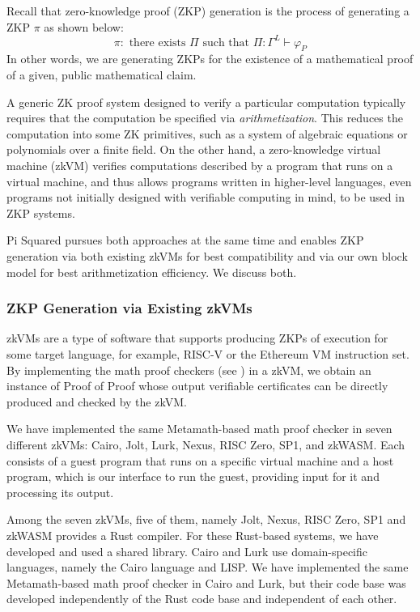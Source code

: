 \documentclass{article}
\begin{document}
Recall that zero-knowledge proof (ZKP) generation is the process of generating
a ZKP $\pi$ as shown below:
\begin{equation*}
\pi \colon \text{ there exists $\Pi$ such that } \Pi \colon \Gamma^L \vdash \varphi_P
\end{equation*}
In other words, we are generating ZKPs for the existence of a mathematical proof of a given, public
mathematical claim.

A generic ZK proof system designed to verify a particular computation
typically requires that the computation be specified via \textit{arithmetization}.
This reduces the computation into some ZK primitives, such as a system of algebraic equations or polynomials
over a finite field.
On the other hand, a zero-knowledge virtual machine (zkVM) verifies computations described by a program that runs on a virtual machine, and thus allows programs written in higher-level languages,
even programs not initially designed with verifiable computing in mind,
to be used in ZKP systems.

Pi Squared pursues both approaches at the same time and enables ZKP generation
via both existing zkVMs for best compatibility and via our own block model
for best arithmetization efficiency.
We discuss both.

\subsubsection{ZKP Generation via Existing zkVMs}

zkVMs are a type of software that supports producing ZKPs
of execution for some target language, for example,
RISC-V or the Ethereum VM instruction set.
By implementing the math proof checkers (see )
in a zkVM, we obtain an instance of Proof of Proof whose output verifiable certificates can be
directly produced and checked by the zkVM.

We have implemented
the same Metamath-based math proof checker
in seven different zkVMs: Cairo, Jolt, Lurk, Nexus, RISC Zero, SP1, and zkWASM.
Each consists of a guest program that runs on a specific virtual machine
and a host program, which is our interface to run the guest,
providing input for it and processing its output.

Among the seven zkVMs, five of them, namely Jolt, Nexus, RISC Zero, SP1 and zkWASM provides a Rust compiler.
For these Rust-based systems, we have developed and used a shared library.
Cairo and Lurk use domain-specific languages, namely the Cairo language and LISP.
We have implemented the same Metamath-based math proof checker in Cairo and Lurk,
but their code base was developed independently of the Rust code base and independent of each other.
\end{document}
